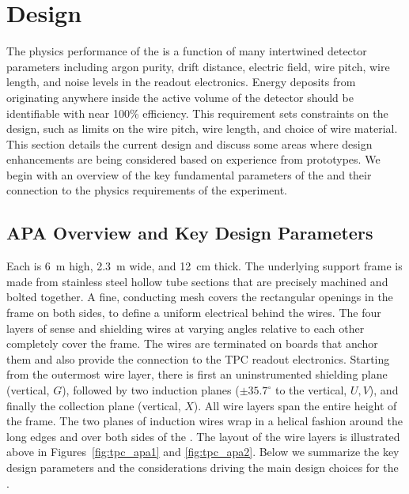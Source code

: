 \section{Design}
\label{sec:fdsp-apa-design}

The physics performance of the  is a function of many intertwined detector parameters including argon purity, drift distance, electric field, wire pitch, wire length, and noise levels in the readout electronics.  Energy deposits from %
originating anywhere inside the active volume of the detector should be identifiable with near \num{100}\% efficiency.  This requirement sets constraints on the  design, such as limits on the wire pitch, wire length, and choice of wire material.  This section details the current %
 design and discuss some areas where design enhancements are being considered based on experience from prototypes.  We begin with an overview of the key fundamental parameters of the  and their connection to the physics requirements of the experiment. 


\subsection{APA Overview and Key Design Parameters}
\label{sec:fdsp-apa-design-overview}

Each  is \SI{6}{m} high, \SI{2.3}{m} wide, and \SI{12}{cm} thick.  The underlying support frame is made from stainless steel hollow tube sections that are precisely machined and bolted together. A fine, conducting mesh covers the rectangular openings in the frame on both sides, to define a uniform electrical  behind the wires. The four layers of sense and shielding wires at varying angles relative to each other completely cover the frame. The wires are terminated on boards that anchor them and also provide the connection to the TPC readout electronics. Starting from the outermost wire layer, there is first an uninstrumented shielding plane (vertical, $G$), followed by two induction planes ($\pm 35.7^{\circ}$ to the vertical, $U,V$), and finally the collection plane (vertical, $X$). All wire layers span the entire height of the  frame. The two planes of induction wires wrap in a helical fashion around the long edges and over both sides of the . The layout of the wire layers is illustrated above in Figures~\ref{fig:tpc_apa1} and \ref{fig:tpc_apa2}.  Below we summarize the key design parameters and the considerations driving the main design choices for the .  %

